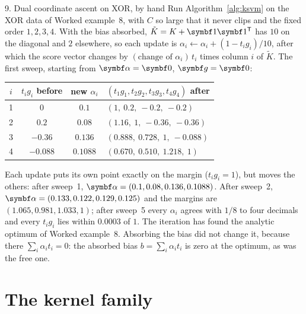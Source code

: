 \documentclass[11pt]{article}
\newcommand{\valpha}{\vect{\alpha}}
\begin{document}
\begin{worked}{9. Dual coordinate ascent on XOR, by hand}
Run Algorithm~\ref{alg:ksvm} on the XOR data of Worked example~8, with $C$ so large that it never clips and the fixed
order $1, 2, 3, 4$. With the bias absorbed, $\tilde K = K + \vect{1}\vect{1}\T$ has $10$ on the diagonal and $2$
elsewhere, so each update is $\alpha_i \gets \alpha_i + (1 - t_ig_i)/10$, after which the score vector changes by
$(\text{change of }\alpha_i)\,t_i$ times column $i$ of $\tilde K$. The first sweep, starting from $\valpha = \vect{0}$,
$\vect{g} = \vect{0}$:
\begin{center}\small
\begin{tabular}{@{}cccl@{}}
\toprule
$i$ & $t_ig_i$ before & new $\alpha_i$ & $(t_1g_1, t_2g_2, t_3g_3, t_4g_4)$ after \\
\midrule
1 & $0$ & $0.1$ & $(1,\ 0.2,\ -0.2,\ -0.2)$ \\
2 & $0.2$ & $0.08$ & $(1.16,\ 1,\ -0.36,\ -0.36)$ \\
3 & $-0.36$ & $0.136$ & $(0.888,\ 0.728,\ 1,\ -0.088)$ \\
4 & $-0.088$ & $0.1088$ & $(0.670,\ 0.510,\ 1.218,\ 1)$ \\
\bottomrule
\end{tabular}
\end{center}
Each update puts its own point exactly on the margin ($t_ig_i = 1$), but moves the others: after sweep~1,
$\valpha = (0.1, 0.08, 0.136, 0.1088)$. After sweep~2, $\valpha = (0.133, 0.122, 0.129, 0.125)$ and the margins are
$(1.065, 0.981, 1.033, 1)$; after sweep~5 every $\alpha_i$ agrees with $1/8$ to four decimals and every $t_ig_i$ lies within
$0.0003$ of $1$. The iteration has found the analytic optimum of Worked example~8. Absorbing the bias did not change it, because
there $\sum_i\alpha_it_i = 0$: the absorbed bias $b = \sum_i\alpha_it_i$ is zero at the optimum, as was the free one.
\end{worked}

\section{The kernel family}\label{sec:family}
\end{document}
